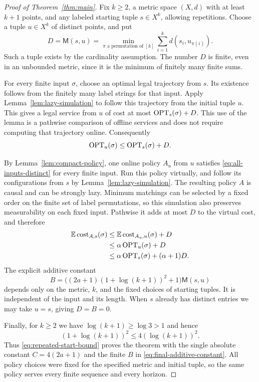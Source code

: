 \begin{proof}[Proof of Theorem~\ref{thm:main}]
Fix $k\ge2$, a metric space $(X,d)$ with at least $k+1$ points, and any
labeled starting tuple $s\in X^k$, allowing repetitions.  Choose a
tuple $u\in X^k$ of distinct points, and put
\begin{equation}
 D=\mathsf M(s,u)
   =\min_{\pi\text{ a permutation of }[k]}
          \sum_{i=1}^k d(s_i,u_{\pi(i)}).
 \label{eq:initial-matching-distance}
\end{equation}
Such a tuple exists by the cardinality assumption.  The number $D$ is
finite, even in an unbounded metric, since it is the minimum of
finitely many finite sums.

For every finite input $\sigma$, choose an optimal legal trajectory
from $s$.  Its existence follows from the finitely many label strings
for that input.  Apply Lemma~\ref{lem:lazy-simulation} to follow this
trajectory from the initial tuple $u$.  This gives a legal service from
$u$ of cost at most $\operatorname{OPT}_s(\sigma)+D$.  This use of the lemma is a
pathwise comparison of offline services and does not require computing
that trajectory online.  Consequently
\begin{equation}
 \operatorname{OPT}_u(\sigma)\le\operatorname{OPT}_s(\sigma)+D.
 \label{eq:offline-start-comparison}
\end{equation}

By Lemma~\ref{lem:compact-policy}, one online policy $A_u$ from $u$
satisfies \eqref{eq:all-inputs-distinct} for every finite input.
Run this policy virtually, and follow its configurations from $s$ by
Lemma~\ref{lem:lazy-simulation}.  The resulting policy $A$ is causal
and can be strongly lazy.  Minimum matchings can be selected by a fixed
order on the finite set of label permutations, so this simulation also
preserves measurability on each fixed input.  Pathwise it adds at most
$D$ to the virtual cost, and therefore
\begin{align}
 \mathbb E\operatorname{cost}_{A,s}(\sigma)
 &\le \mathbb E\operatorname{cost}_{A_u,u}(\sigma)+D \notag\\
 &\le \alpha\operatorname{OPT}_u(\sigma)+D \notag\\
 &\le \alpha\operatorname{OPT}_s(\sigma)+(\alpha+1)D.
 \label{eq:repeated-start-bound}
\end{align}
The explicit additive constant
\begin{equation}
 B=\bigl((2a+1)(1+\log(k+1))^2+1\bigr)\mathsf M(s,u)
 \label{eq:final-additive-constant}
\end{equation}
depends only on the metric, $k$, and the fixed choices of starting
tuples.  It is independent of the input and its length.  When $s$
already has distinct entries we may take $u=s$, giving $D=B=0$.

Finally, for $k\ge2$ we have $\log(k+1)\ge\log3>1$ and hence
\[
 (1+\log(k+1))^2\le4(\log(k+1))^2.
\]
Thus \eqref{eq:repeated-start-bound} proves the theorem with the single
absolute constant $C=4(2a+1)$ and the finite $B$ in
\eqref{eq:final-additive-constant}.  All policy choices were fixed for
the specified metric and initial tuple, so the same policy serves
every finite sequence and every horizon.
\end{proof}
